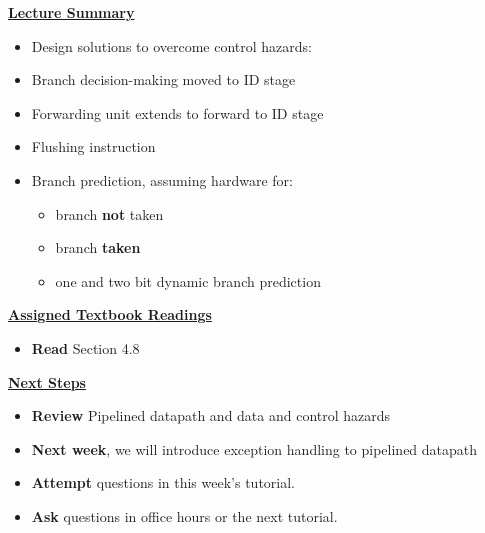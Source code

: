 \begin{frame}[fragile]
 \underline{\textbf{Lecture Summary}}
 \begin{itemize}
\item Design solutions to overcome control hazards:
\item Branch decision-making moved to ID stage
    \item Forwarding unit extends to forward to ID stage

\item Flushing instruction 
\item Branch prediction, assuming hardware for: 
\begin{itemize}
    \item branch \textbf{not} taken 
\item branch \textbf{taken}
\item one and two bit dynamic branch prediction
\end{itemize}
    \end{itemize}

 \underline{\textbf{Assigned Textbook Readings}}
\begin{itemize}
     \item \textbf{Read} Section 4.8 %
     \end{itemize}
    \underline{\textbf{Next Steps}}
    \begin{itemize}
     \item \textbf{Review} Pipelined datapath and data and control hazards 
\item \textbf{Next week}, we will introduce exception handling to pipelined datapath
\item \textbf{Attempt} questions in this week's tutorial. 
    \item \textbf{Ask} questions in office hours or the next tutorial.
 \end{itemize}

\end{frame}
